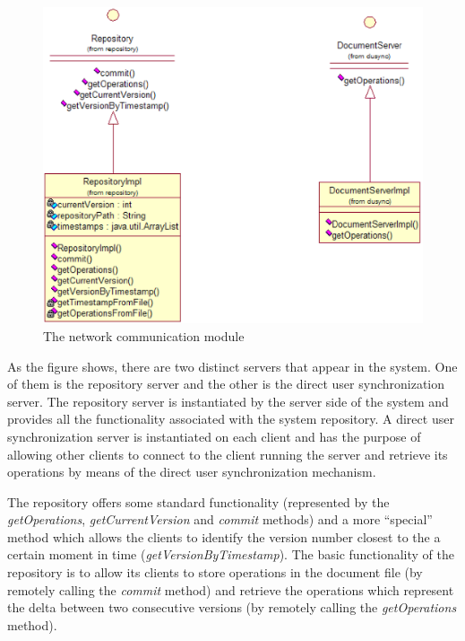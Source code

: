 \begin{figure}[htb]
\begin{center}
\includegraphics{img/CommUML.eps}
\end{center}
\caption{The network communication module}
\label{fig:commuml}
\end{figure}

As the figure shows, there are two distinct servers that appear in the system. One of them
is the repository server and the other is the direct user synchronization server. The
repository server is instantiated by the server side of the system and provides all the
functionality associated with the system repository. A direct user synchronization
server is instantiated on each client and has the purpose of allowing other clients to
connect to the client running the server and retrieve its operations by means of the
direct user synchronization mechanism.

The repository offers some standard functionality (represented by the \emph{getOperations},
\emph{getCurrentVersion} and \emph{commit} methods) and a more ``special'' method which allows
the clients to identify the version number closest to the a certain moment in time
(\emph{getVersionByTimestamp}). The basic functionality of the repository is to allow
its clients to store operations in the document file (by remotely calling the \emph{commit}
method) and retrieve the operations which represent the delta between two consecutive
versions (by remotely calling the \emph{getOperations} method).

